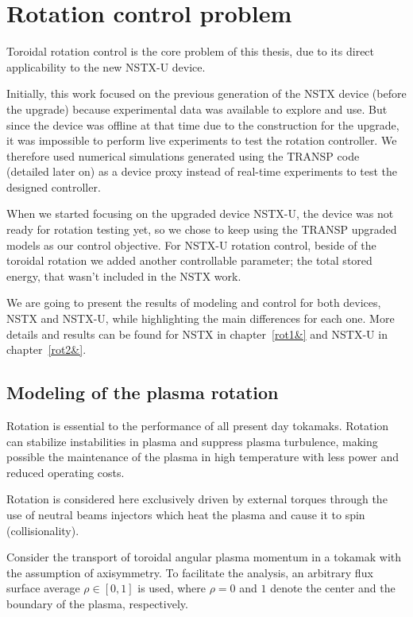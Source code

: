 \documentclass[12pt,lot, lof]{puthesis}
\begin{document}
\chapter{Rotation control problem}

Toroidal rotation control is the core problem of this thesis, due to its direct applicability to the new NSTX-U device.

Initially, this work focused on the previous generation of the NSTX device (before the upgrade) because experimental data was available to explore and use.
But since the device was offline at that time due to the construction for the upgrade, it was impossible to perform live experiments to test the rotation controller.
We therefore used numerical simulations generated using the TRANSP code~\cite{Budny94} (detailed later on) as a device proxy instead of real-time experiments to test the designed controller.

When we started focusing on the upgraded device NSTX-U, the device was not ready for rotation testing yet, so we chose to keep using the TRANSP upgraded models as our control objective.
For NSTX-U rotation control, beside of the toroidal rotation we added another controllable parameter; the total stored energy, that wasn't included in the NSTX work. 


We are going to present the results of modeling and control for both devices, NSTX and NSTX-U, while highlighting the main differences for each one. More details and results can be found  for NSTX in chapter~\ref{rot1&} and NSTX-U in chapter~\ref{rot2&}. 


\section{Modeling of the plasma rotation}

Rotation is essential to the performance of all present day tokamaks. Rotation can stabilize instabilities in plasma and suppress plasma turbulence, making possible the maintenance of the plasma in high temperature with less power and reduced operating costs. 

Rotation is considered here exclusively driven by external torques through the use of neutral beams injectors which heat the plasma and cause it to spin (collisionality).

Consider the transport of toroidal angular plasma momentum in a tokamak with the assumption of axisymmetry.  To facilitate the analysis, an arbitrary flux surface average $\rho \in [0,1]$ is used, where $\rho = 0$ and $1$ denote the center and the boundary of the plasma, respectively.  
\end{document}
